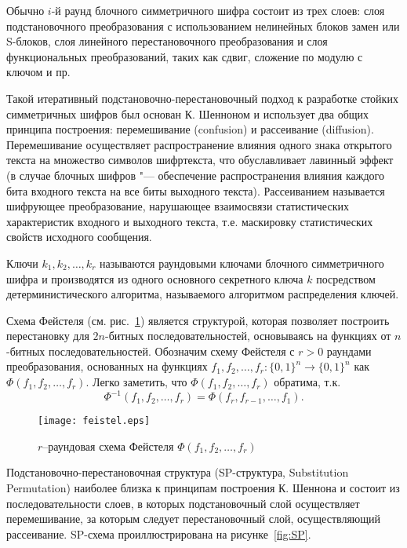 Обычно $i$-й раунд блочного симметричного шифра состоит из трех слоев: слоя
подстановочного преобразования с использованием нелинейных блоков замен или
S-блоков,  слоя линейного перестановочного преобразования и  слоя функциональных
преобразований, таких как сдвиг, сложение по модулю с ключом и пр.

Такой итеративный подстановочно-перестановочный подход к разработке стойких
симметричных шифров был основан К. Шенноном и использует два общих принципа
построения: перемешивание (confusion) и рассеивание (diffusion). Перемешивание
осуществляет распространение влияния одного знака открытого текста на множество
символов шифртекста, что обуславливает лавинный эффект (в случае блочных шифров
"--- обеспечение распространения влияния каждого бита входного текста на все
биты выходного текста). Рассеиванием называется шифрующее преобразование,
нарушающее взаимосвязи статистических характеристик входного и выходного текста,
т.е. маскировку статистических свойств исходного сообщения.

Ключи $k_1, k_2, \ldots, k_r$ называются раундовыми ключами блочного
симметричного шифра и производятся из одного основного секретного ключа $k$
посредством детерминистического алгоритма, называемого алгоритмом распределения
ключей.

Схема Фейстеля (см. рис.~\ref{fig:feistel}) является структурой, которая
позволяет построить перестановку для $2n$-битных последовательностей,
основываясь на функциях от $n$-битных последовательностей. Обозначим схему
Фейстеля с $r > 0$ раундами преобразования, основанных на функциях $f_1, f_2,
\ldots, f_r: \{0, 1\}^n \rightarrow \{0, 1\}^n$ как $\Phi(f_1, f_2, \ldots,
f_r)$. Легко заметить, что $\Phi(f_1, f_2, \ldots, f_r)$ обратима, т.к.
\begin{equation}\Phi^{-1}(f_1, f_2, \ldots, f_r) = \Phi(f_r, f_{r-1}, \ldots,
f_1).\end{equation}

\begin{figure}
    \centering\texttt{[image: feistel.eps]}
    \caption{$r$–раундовая схема Фейстеля $\Phi(f_1, f_2, \ldots, f_r)$}
    \label{fig:feistel}
\end{figure}

Подстановочно-перестановочная структура (SP-структура, Substitution Permutation)
наиболее близка к принципам построения К. Шеннона и состоит из
последовательности слоев, в которых подстановочный слой осуществляет
перемешивание, за которым следует перестановочный слой, осуществляющий
рассеивание. SP-схема проиллюстрирована на рисунке~\ref{fig:SP}.

